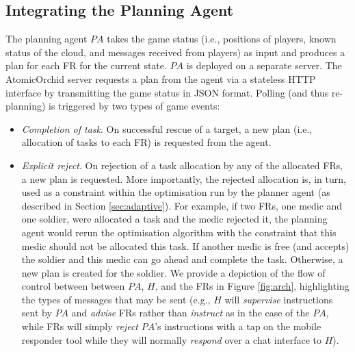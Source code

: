 \subsection{Integrating the Planning Agent}
\noindent The planning agent $PA$ takes the game status (i.e., positions of players, known status of the cloud, and messages received from players) as input and produces a plan for each FR  for the current state. $PA$ is deployed on a separate server. The AtomicOrchid server requests a plan from the agent via a stateless HTTP interface by transmitting the game status in JSON format. Polling (and thus re-planning) is triggered by two types of game events:
\begin{itemize}
\item \textit{Completion of task}. On successful rescue of a target, a new plan (i.e., allocation of tasks to each FR) is requested from the agent.
\item \textit{Explicit reject}. On rejection of a task allocation by any of the allocated FRs, a new plan is requested.  More importantly, the rejected allocation is, in turn, used as a constraint within the optimisation run by the planner agent (as described in Section \ref{sec:adaptive}). For example, if two FRs, one medic and one soldier, were allocated a task and the medic rejected it, the planning agent would rerun the optimisation algorithm with the constraint that this medic should not be allocated this task. If another medic is free (and accepts) the soldier and this medic can go ahead and complete the task. Otherwise, a new plan is created for the soldier. We provide a depiction of the flow of control between  between $PA$, $H$, and the FRs in Figure \ref{fig:arch}, highlighting the types of messages that may be sent (e.g., $H$ will \emph{supervise} instructions sent by $PA$ and \emph{advise} FRs rather than \emph{instruct} as in the case of the $PA$, while FRs will simply \emph{reject} $PA$'s instructions with a tap on the mobile responder tool while they will normally \emph{respond} over a chat interface to $H$).
\end{itemize} 

